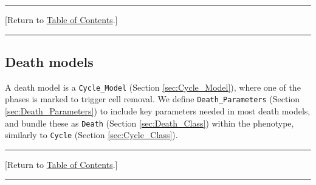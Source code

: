\documentclass[12pt]{article}
\renewcommand{\v}{\verb}
\newcommand{\blue}[1]{\textcolor{blue}{#1}}
\newcommand{\DONE}{}%
\newcommand{\TOClink}{\begin{center}\hrule\vskip-10pt\phantom{.}\hfill[Return to \hyperlink{TOC}{Table of Contents}.]\hfill\phantom{.}\vskip3pt\hrule\end{center}}
\begin{document}







\TOClink 

\subsection{Death models \DONE}
\label{sec:Death}
A death model is a \v|Cycle_Model| (Section \ref{sec:Cycle_Model}), where one of the phases is marked to trigger 
cell removal. We define \v|Death_Parameters| (Section \ref{sec:Death_Parameters}) to include key parameters 
needed in most death models, and bundle these as \v|Death| (Section \ref{sec:Death_Class}) 
within the phenotype, similarly to \v|Cycle| (Section \ref{sec:Cycle_Class}). 

\TOClink 
\end{document}
